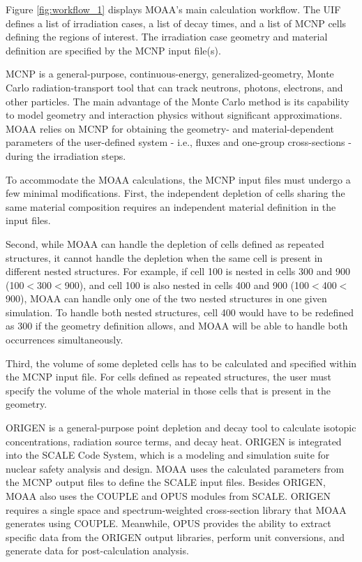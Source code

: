 \documentclass{style/nseJournal}
\begin{document}
Figure \ref{fig:workflow_1} displays MOAA's main calculation workflow.
The \gls*{UIF} defines a list of irradiation cases, a list of decay times, and a list of MCNP cells defining the regions of interest.
The irradiation case geometry and material definition are specified by the MCNP input file(s).

MCNP is a general-purpose, continuous-energy, generalized-geometry, Monte Carlo radiation-transport tool that can track neutrons, photons, electrons, and other particles.
The main advantage of the Monte Carlo method is its capability to model geometry and interaction physics without significant approximations.
MOAA relies on MCNP for obtaining the geometry- and material-dependent parameters of the user-defined system - i.e., fluxes and one-group cross-sections - during the irradiation steps.

To accommodate the MOAA calculations, the MCNP input files must undergo a few minimal modifications.
First, the independent depletion of cells sharing the same material composition requires an independent material definition in the input files.

Second, while MOAA can handle the depletion of cells defined as repeated structures, it cannot handle the depletion when the same cell is present in different nested structures.
For example, if cell 100 is nested in cells 300 and 900 (100$<$300$<$900), and cell 100 is also nested in cells 400 and 900 (100$<$400$<$900), MOAA can handle only one of the two nested structures in one given simulation.
To handle both nested structures, cell 400 would have to be redefined as 300 if the geometry definition allows, and MOAA will be able to handle both occurrences simultaneously.

Third, the volume of some depleted cells has to be calculated and specified within the MCNP input file.
For cells defined as repeated structures, the user must specify the volume of the whole material in those cells that is present in the geometry.

ORIGEN is a general-purpose point depletion and decay tool to calculate isotopic concentrations, radiation source terms, and decay heat.
ORIGEN is integrated into the SCALE Code System, which is a modeling and simulation suite for nuclear safety analysis and design.
MOAA uses the calculated parameters from the MCNP output files to define the SCALE input files.
Besides ORIGEN, MOAA also uses the COUPLE and OPUS modules from SCALE.
ORIGEN requires a single space and spectrum-weighted cross-section library that MOAA generates using COUPLE.
Meanwhile, OPUS provides the ability to extract specific data from the ORIGEN output libraries, perform unit conversions, and generate data for post-calculation analysis.
\end{document}
